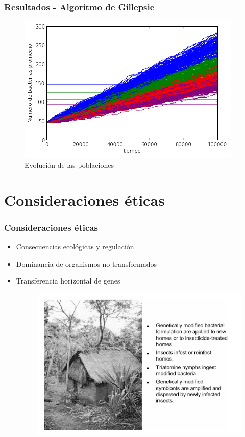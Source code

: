 \documentclass{beamer}
\begin{document}

\begin{frame}
\frametitle{Resultados - Algoritmo de Gillepsie}

\begin{figure}[ht!]
\vspace*{-1cm}
\includegraphics[scale=0.65]{todasLasCorridas.png} 
\caption{Evolución de las poblaciones}
\end{figure} 

\end{frame}

\section{Consideraciones éticas}

\begin{frame}
\frametitle{Consideraciones éticas}

\begin{itemize}
\item Consecuencias ecológicas y regulación
\item Dominancia de organismos no transformados
\item Transferencia horizontal de genes
\begin{figure}[ht!]
\includegraphics[scale=0.4]{casa.PNG} 

\end{figure} 

\end{itemize}
\end{frame}
\end{document}
